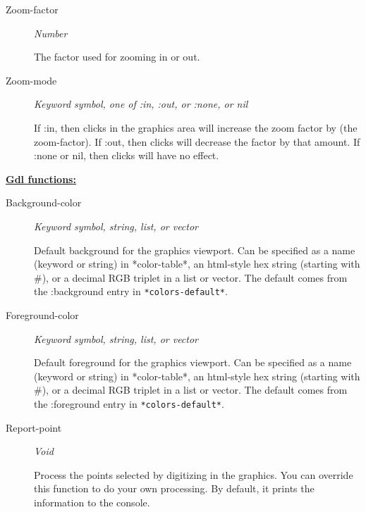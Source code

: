 \documentclass [11pt]{book}
\begin{document}
\begin{itemize}
\begin{description}
\item [Zoom-factor]
\emph{Number}

 The factor used for zooming in or out.




\item [Zoom-mode]
\emph{Keyword symbol, one of :in, :out, or :none, or nil}

 If :in, then clicks
in the graphics area will increase the zoom factor by (the zoom-factor). If :out,
then clicks will decrease the factor by that amount. If :none or nil, then clicks
will have no effect.




\end{description}






\textbf{
\underline{Gdl functions:}}

\begin{description}

\item [Background-color]
\emph{Keyword symbol, string, list, or vector}

 Default background for the graphics viewport. Can be specified
as a name (keyword or string) in *color-table*, an html-style hex string (starting with \#), or a decimal RGB
triplet in a list or vector. The default comes from the :background entry in \texttt{*colors-default*}.




\item [Foreground-color]
\emph{Keyword symbol, string, list, or vector}

 Default foreground for the graphics viewport. Can be specified
as a name (keyword or string) in *color-table*, an html-style hex string (starting with \#), or a decimal RGB
triplet in a list or vector. The default comes from the :foreground entry in \texttt{*colors-default*}.




\item [Report-point]
\emph{Void}

 Process the points selected by digitizing in the graphics. You can override this
function to do your own processing. By default, it prints the information to the console.





\end{description}
\end{itemize}
\end{document}
